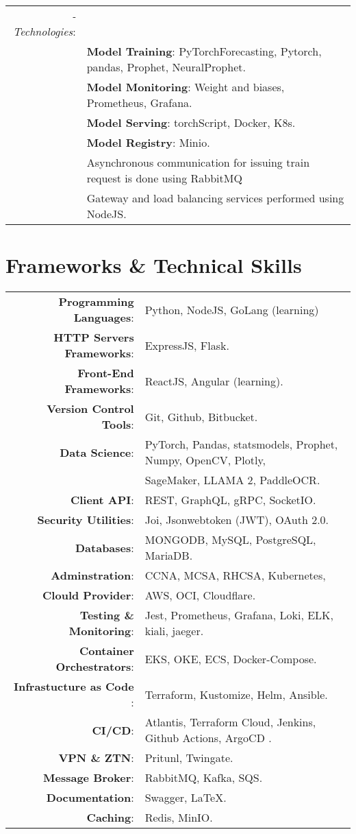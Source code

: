 \documentclass[a4paper,10pt]{article}
\begin{document}
\begin{tabular}{r|l}
    \textit{-Technologies}:\\&
     \textbf{Model Training}: PyTorchForecasting, Pytorch, pandas, Prophet, NeuralProphet. \\&
     \textbf{Model Monitoring}: Weight and biases, Prometheus, Grafana.\\&
     \textbf{Model Serving}: torchScript, Docker, K8s. \\&
     \textbf{Model Registry}: Minio. \\&
    Asynchronous communication for issuing train request is done using RabbitMQ \\&
    Gateway and load balancing services performed using NodeJS. 
\\
\end{tabular}

\section{\textbf{Frameworks \& Technical Skills}}

\begin{longtable}{r p{16cm}}	
    \textbf{Programming Languages}:& Python, NodeJS, GoLang (learning)\\
    \textbf{HTTP Servers Frameworks}:& ExpressJS, Flask.\\
    \textbf{Front-End Frameworks}:& ReactJS, Angular (learning).\\
    \textbf{Version Control Tools}:& Git, Github, Bitbucket.\\
    \textbf{Data Science}:& PyTorch, Pandas, statsmodels, Prophet, Numpy, OpenCV, Plotly,\\
    & SageMaker, LLAMA 2, PaddleOCR.\\
    \textbf{Client API}:& REST, GraphQL, gRPC, SocketIO.\\
    \textbf{Security Utilities}:& Joi, Jsonwebtoken (JWT), OAuth 2.0.\\ 
    \textbf{Databases}:& MONGODB, MySQL, PostgreSQL, MariaDB.\\
    \textbf{Adminstration}:& CCNA, MCSA, RHCSA, Kubernetes,\\
    \textbf{Clould Provider}:& AWS, OCI, Cloudflare. \\
    \textbf{Testing \& Monitoring}:& Jest, Prometheus, Grafana, Loki, ELK, kiali, jaeger.\\ 
    \textbf{Container Orchestrators}:& EKS, OKE, ECS, Docker-Compose. \\
    \textbf{Infrastucture as Code }:& Terraform, Kustomize, Helm, Ansible.\\
    \textbf{CI/CD}:& Atlantis, Terraform Cloud, Jenkins, Github Actions, ArgoCD .\\
    \textbf{VPN \& ZTN}:& Pritunl, Twingate. \\
    \textbf{Message Broker}:& RabbitMQ, Kafka, SQS.\\
    \textbf{Documentation}:& Swagger, \LaTeX.\\
    \textbf{Caching}:& Redis, MinIO.\\
\end{longtable}
\end{document}
